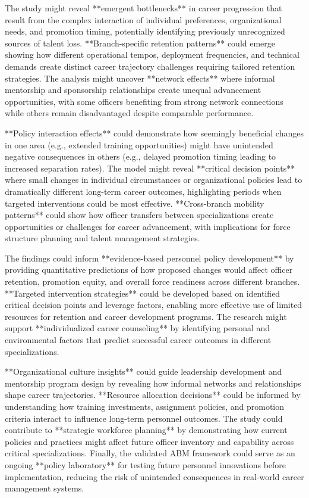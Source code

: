 \documentclass[main.tex]{subfiles}
\begin{document}

The study might reveal **emergent bottlenecks** in career progression that result from the complex interaction of individual preferences, organizational needs, and promotion timing, potentially identifying previously unrecognized sources of talent loss. **Branch-specific retention patterns** could emerge showing how different operational tempos, deployment frequencies, and technical demands create distinct career trajectory challenges requiring tailored retention strategies. The analysis might uncover **network effects** where informal mentorship and sponsorship relationships create unequal advancement opportunities, with some officers benefiting from strong network connections while others remain disadvantaged despite comparable performance.

**Policy interaction effects** could demonstrate how seemingly beneficial changes in one area (e.g., extended training opportunities) might have unintended negative consequences in others (e.g., delayed promotion timing leading to increased separation rates). The model might reveal **critical decision points** where small changes in individual circumstances or organizational policies lead to dramatically different long-term career outcomes, highlighting periods when targeted interventions could be most effective. **Cross-branch mobility patterns** could show how officer transfers between specializations create opportunities or challenges for career advancement, with implications for force structure planning and talent management strategies.


The findings could inform **evidence-based personnel policy development** by providing quantitative predictions of how proposed changes would affect officer retention, promotion equity, and overall force readiness across different branches. **Targeted intervention strategies** could be developed based on identified critical decision points and leverage factors, enabling more effective use of limited resources for retention and career development programs. The research might support **individualized career counseling** by identifying personal and environmental factors that predict successful career outcomes in different specializations.

**Organizational culture insights** could guide leadership development and mentorship program design by revealing how informal networks and relationships shape career trajectories. **Resource allocation decisions** could be informed by understanding how training investments, assignment policies, and promotion criteria interact to influence long-term personnel outcomes. The study could contribute to **strategic workforce planning** by demonstrating how current policies and practices might affect future officer inventory and capability across critical specializations. Finally, the validated ABM framework could serve as an ongoing **policy laboratory** for testing future personnel innovations before implementation, reducing the risk of unintended consequences in real-world career management systems.

\end{document}
